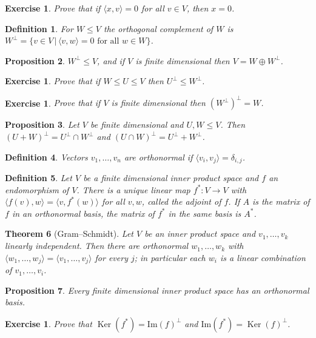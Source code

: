 \documentclass[12pt]{article}
\newcommand{\double}{\hspace{2pt}}
\DeclareMathOperator{\Ker}{Ker}
\theoremstyle{breakplain}
\newtheorem{theorem}{Theorem}[section]
\newtheorem{prop}[theorem]{Proposition}
\theoremstyle{breakdef}
\newtheorem{definition}[theorem]{Definition}
\newtheorem{ex}[subsubsection]{Exercise}
\theoremstyle{remark}
\begin{document}
\begin{ex}
    Prove that if $\langle x,v\rangle=0$ for all $v\in V$, then $x=0$.
\end{ex}
\begin{definition}
    For $W\leq V$ the \emph{orthogonal complement} of $W$ is $W^{\perp}=\{v\in V\double|\double\langle v,w\rangle=0 \text{ for all } w\in W\}$.
\end{definition}
\begin{prop}
    $W^\perp \leq V$, and if $V$ is finite dimensional then $V=W\oplus W^\perp$.
\end{prop}
\begin{ex}
    Prove that if $W \leq U\leq V$ then $U^\perp \leq W^\perp$.
\end{ex}
\begin{ex}
    Prove that if $V$ is finite dimensional then $(W^\perp)^\perp=W$.
\end{ex}
\begin{prop}
    Let $V$ be finite dimensional and $U,W\leq V$. Then $(U+W)^\perp=U^\perp \cap W^\perp$ and $(U\cap W)^\perp=U^\perp+W^\perp$.
\end{prop}
\begin{definition}
    Vectors $v_1,\dots, v_n$ are \emph{orthonormal} if $\langle  v_i,v_j\rangle=\delta_{i,j}$.
\end{definition}
\begin{definition}
    Let $V$ be a finite dimensional inner product space and $f$ an endomorphism of $V$. There is a unique linear map $f^*:V\to V$ with $\langle f(v),w\rangle=\langle v,f^*(w)\rangle$ for all $v,w$, called the \emph{adjoint} of $f$. If $A$ is the matrix of $f$ in an orthonormal basis, the matrix of $f^*$ in the same basis is $A^*$.
\end{definition}
\begin{theorem}[Gram--Schmidt]
    Let $V$ be an inner product space and $v_1,\dots,v_k$ linearly independent. Then there are orthonormal $w_1,\dots,w_k$ with $\langle w_1,\ldots,w_j\rangle=\langle v_1,\ldots,v_j\rangle$ for every $j$; in particular each $w_i$ is a linear combination of $v_1,\ldots,v_i$.
\end{theorem}
\begin{prop}
    Every finite dimensional inner product space has an orthonormal basis.
\end{prop}
\begin{ex}
    Prove that $\Ker(f^*)=\mathrm{Im}(f)^\perp$ and $\mathrm{Im}(f^*)=\Ker(f)^\perp$.
\end{ex}
\end{document}
